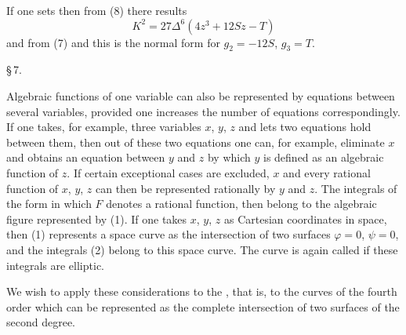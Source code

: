 If one sets
then from (8) there results
\[
K^2 = 27\Delta^6(4z^3+12Sz-T)
\]
and from (7)
and this is the  normal form for $g_2=-12S$,
$g_3=T$.

\begin{center}
\S\,7. 
\end{center}

Algebraic functions of one variable can also be represented by
equations between several variables, provided one increases the
number of equations correspondingly. If one takes, for example,
three variables $x$, $y$, $z$ and lets two equations
hold between them, then out of these two equations one can, for
example, eliminate $x$ and obtains an equation between $y$ and $z$ by
which $y$ is defined as an algebraic function of $z$. If certain
exceptional cases are excluded, $x$ and every rational function of
$x$, $y$, $z$ can then be represented rationally by $y$ and $z$. The
integrals of the form
in which $F$ denotes a rational function, then belong to the
algebraic figure represented by (1). If one takes
$x$, $y$, $z$ as Cartesian coordinates in space, then (1) represents
a space curve as the intersection of two surfaces $\varphi=0$,
$\psi=0$, and the integrals (2) belong to this space curve.
The curve is again called  if these integrals are elliptic.

We wish to apply these considerations to the , that is, to the curves of the
fourth order which can be represented as the complete intersection of
two surfaces of the second degree.
